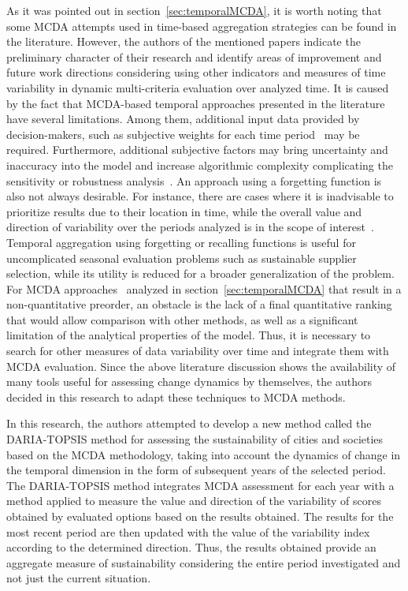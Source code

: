 \documentclass[5p,times]{elsarticle}
\begin{document}
As it was pointed out in section~\ref{sec:temporalMCDA}, it is worth noting that some MCDA attempts used in time-based aggregation strategies can be found in the literature. However, the authors of the mentioned papers indicate the preliminary character of their research and identify areas of improvement and future work directions considering using other indicators and measures of time variability in dynamic multi-criteria evaluation over analyzed time. It is caused by the fact that MCDA-based temporal approaches presented in the literature have several limitations. Among them, additional input data provided by decision-makers, such as subjective weights for each time period~\cite{frini2018making, banamar2018extension, urli2019promethee, frini2019mupom} may be required. Furthermore, additional subjective factors may bring uncertainty and inaccuracy into the model and increase algorithmic complexity complicating the sensitivity or robustness analysis~\cite{urli2019promethee, frini2019mupom}. An approach using a forgetting function is also not always desirable. For instance, there are cases where it is inadvisable to prioritize results due to their location in time, while the overall value and direction of variability over the periods analyzed is in the scope of interest~\cite{watrobski2016multistage, karczmarczyk2018comparative, kizielewicz2021study}. Temporal aggregation using forgetting or recalling functions is useful for uncomplicated seasonal evaluation problems such as sustainable supplier selection, while its utility is reduced for a broader generalization of the problem. For MCDA approaches~\cite{frini2020temporal, mouhib2021tsmaa, khalili2013application} analyzed in section~\ref{sec:temporalMCDA} that result in a non-quantitative preorder, an obstacle is the lack of a final quantitative ranking that would allow comparison with other methods, as well as a significant limitation of the analytical properties of the model. Thus, it is necessary to search for other measures of data variability over time and integrate them with MCDA evaluation. Since the above literature discussion shows the availability of many tools useful for assessing change dynamics by themselves, the authors decided in this research to adapt these techniques to MCDA methods.

In this research, the authors attempted to develop a new method called the DARIA-TOPSIS method for assessing the sustainability of cities and societies based on the MCDA methodology, taking into account the dynamics of change in the temporal dimension in the form of subsequent years of the selected period. The DARIA-TOPSIS method integrates MCDA assessment for each year with a method applied to measure the value and direction of the variability of scores obtained by evaluated options based on the results obtained. The results for the most recent period are then updated with the value of the variability index according to the determined direction. Thus, the results obtained provide an aggregate measure of sustainability considering the entire period investigated and not just the current situation.
\end{document}
